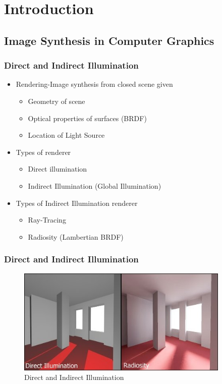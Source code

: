 
\section{Introduction} 

  \subsection{Image Synthesis in Computer Graphics}

      \begin{frame}\frametitle{Direct and Indirect Illumination}
      \begin{itemize}
      \setlength\itemsep{1.5 em}
      \item Rendering-Image synthesis from closed scene given
      \begin{itemize}
      \item Geometry of scene
      \item Optical properties of surfaces (BRDF)
      \item Location of Light Source
      \end{itemize}
      \item Types of renderer
      \begin{itemize}
      \setlength\itemsep{0.5 em}
      \item Direct illumination
      \item Indirect Illumination (Global Illumination)
      \end{itemize}
      \item Types of Indirect Illumination renderer
      \begin{itemize}
      \setlength\itemsep{0.5 em}
      \item Ray-Tracing
      \item Radiosity (Lambertian BRDF)
      \end{itemize}
      \end{itemize}
      \end{frame}



      \begin{frame}\frametitle{Direct and Indirect Illumination}
       \begin{figure}
        \centering
        \includegraphics[width=4in]{DirectIndirect.jpg}
        \caption{Direct and Indirect Illumination}
        \label{idealscalable}
        \end{figure}
      \end{frame}



